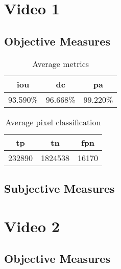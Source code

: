 
\section{Video 1}
\subsection{Objective Measures}

\begin{minipage}[c]{0.475\textwidth}
\begin{table}[H]
    \centering
    \begin{tabular}{||c c c||} 
        \hline
        \acrshort{iou} & \acrshort{dc} & \acrshort{pa} \\ [0.5ex] 
        \hline\hline
        93.590\% & 96.668\% & 99.220\% \\ [1ex] 
        \hline
    \end{tabular}
    \caption{Average metrics}
    \label{tab:metrics_video_1}
\end{table}
\end{minipage}
\begin{minipage}[c]{0.475\textwidth}
\begin{table}[H]
    \centering
    \begin{tabular}{||c c c||} 
        \hline
        \acrshort{tp} & \acrshort{tn} & \acrshort{fpn} \\ [0.5ex] 
        \hline\hline
        232890 & 1824538 & 16170 \\ [1ex] 
        \hline
    \end{tabular}
    \caption{Average pixel classification}
    \label{tab:pixels_video_1}
\end{table}
\end{minipage}

\subsection{Subjective Measures}


\section{Video 2}
\subsection{Objective Measures}

